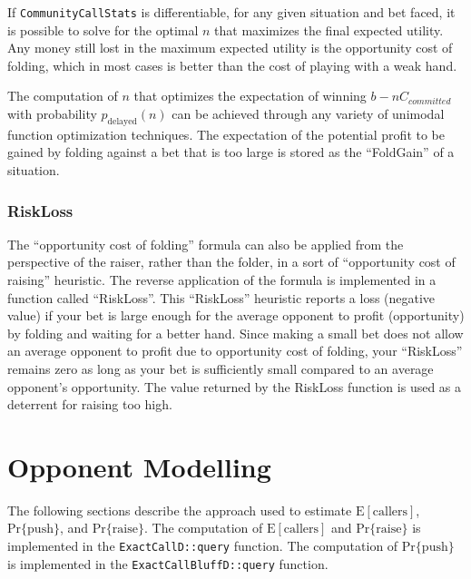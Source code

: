 If \texttt{CommunityCallStats} is differentiable, for any given situation and bet faced, it is possible to solve for the optimal $n$ that maximizes the final expected utility.
Any money still lost in the maximum expected utility is the opportunity cost of folding, which in most cases is better than the cost of playing with a weak hand.

The computation of $n$ that optimizes the expectation of winning $b-n C_{committed}$ with probability $p_{\mathrm{delayed}}(n)$ can be achieved through any variety of unimodal function optimization techniques.
The expectation of the potential profit to be gained by folding against a bet that is too large is stored as the ``FoldGain'' of a situation.

\subsubsection{RiskLoss}
\label{sec:RiskLoss}
The ``opportunity cost of folding'' formula can also be applied from the perspective of the raiser, rather than the folder, in a sort of ``opportunity cost of raising'' heuristic.
The reverse application of the formula is implemented in a function called ``RiskLoss''.
This ``RiskLoss'' heuristic reports a loss (negative value) if your bet is large enough for the average opponent to profit (opportunity) by folding and waiting for a better hand.
Since making a small bet does not allow an average opponent to profit due to opportunity cost of folding, your ``RiskLoss'' remains zero as long as your bet is sufficiently small compared to an average opponent's opportunity.
The value returned by the RiskLoss function is used as a deterrent for raising too high.


\section{Opponent Modelling}

The following sections describe the approach used to estimate $\mathrm{E[callers]}$, $\mathrm{Pr\{push\}}$, and $\mathrm{Pr\{raise\}}$.
The computation of $\mathrm{E[callers]}$ and $\mathrm{Pr\{raise\}}$ is implemented in the \texttt{ExactCallD::query} function.
The computation of $\mathrm{Pr\{push\}}$ is implemented in the \texttt{ExactCallBluffD::query} function.

